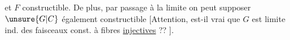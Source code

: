 et $F$ constructible. De plus, par passage à la limite on peut supposer  $\unsure{G|C}$ également constructible [Attention, est-il vrai que $G$ est limite ind.  des  faisceaux const. à fibres \uline{injectives} ?? ].
